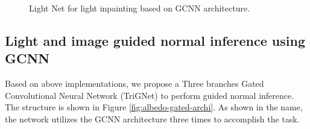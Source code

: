 \documentclass[border=15pt, multi, tikz]{article}
\begin{document}
\begin{figure}[th]
\caption{Light Net for light inpainting based on GCNN architecture.}
\label{fig:light-net-archi}
\end{figure}


\subsection{Light and image guided normal inference using GCNN}
Based on above implementations, we propose a Three branches Gated Convolutional Neural Network (TriGNet) to perform guided normal inference. The structure is shown in Figure \ref{fig:albedo-gated-archi}. As shown in the name, the network utilizes the GCNN architecture three times to accomplish the task. 
\end{document}
